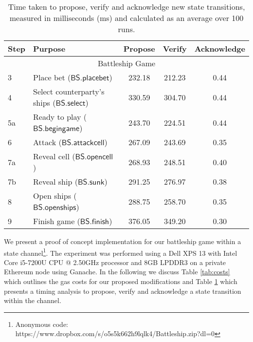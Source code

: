 \documentclass{llncs}
\newcommand{\battleshipattackcell}{\mathsf{BS.attackcell}}
\newcommand{\battleshipbegin}{\mathsf{BS.begingame}}
\newcommand{\battleshipplacebet}{\mathsf{BS.placebet}}
\newcommand{\battleshipselectboard}{\mathsf{BS.select}}
\newcommand{\battleshiprevealcell}{\mathsf{BS.opencell}}
\newcommand{\battleshipsinking}{\mathsf{BS.sunk}}
\newcommand{\battleshiprevealboard}{\mathsf{BS.openships}}
\newcommand{\battleshipfinish}{\mathsf{BS.finish}}
\begin{document}
	\begin{table}
        \centering
        \begin{tabular}[]{l l c c c}
            
            \textbf{Step} & \textbf{Purpose} & \textbf{Propose} & \textbf{Verify} & \textbf{Acknowledge}\\ 
            \hline
            \multicolumn{5}{c}{Battleship Game} \\
            \hline
            3 & Place bet ($\battleshipplacebet$)& 232.18 & 212.23 & 0.44 \\
            4 & Select counterparty's ships ($\battleshipselectboard$) & 330.59 & 304.70 & 0.44 \\ 
            5a & Ready to play ($\battleshipbegin$) & 243.70 & 224.51 & 0.44 \\
            6 & Attack ($\battleshipattackcell$) & 267.09 & 243.69 & 0.35 \\
            7a & Reveal cell ($\battleshiprevealcell$) & 268.93 & 248.51 & 0.40 \\
            7b & Reveal ship ($\battleshipsinking$) & 291.25 & 276.97 & 0.38 \\
            8 & Open ships ($\battleshiprevealboard$) & 288.75 & 258.70 & 0.35 \\
            9 & Finish game ($\battleshipfinish$) & 376.05 & 349.20 & 0.30 \\
            \hline 
        \end{tabular}
        
        \caption{Time taken to propose, verify and acknowledge new state transitions, measured in milliseconds (ms) and calculated as an average over 100 runs.}\label{tab:timings}
    \end{table}
	
	We present a proof of concept implementation for our battleship game within a state channel\footnote{Anonymous code: https://www.dropbox.com/s/o5s5k662h9lqlk4/Battleship.zip?dl=0}. The experiment was performed using a Dell XPS 13 with Intel Core i5-7200U CPU @ 2.50GHz processor and 8GB LPDDR3 on a private Ethereum node using Ganache\cite{ganache}.
    In the following we discuss Table \ref{tab:costs} which outlines the gas costs for our proposed modifications and Table \ref{tab:timings} which presents a timing analysis to propose, verify and acknowledge a state transition within the channel. 
\end{document}
